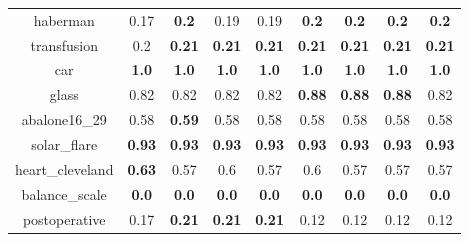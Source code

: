 \documentclass{article}%
\begin{document}
\begin{tabular}{c|cccccccc}
haberman&0.17&\textbf{0.2}&0.19&0.19&\textbf{0.2}&\textbf{0.2}&\textbf{0.2}&\textbf{0.2}\\%

transfusion&0.2&\textbf{0.21}&\textbf{0.21}&\textbf{0.21}&\textbf{0.21}&\textbf{0.21}&\textbf{0.21}&\textbf{0.21}\\%

car&\textbf{1.0}&\textbf{1.0}&\textbf{1.0}&\textbf{1.0}&\textbf{1.0}&\textbf{1.0}&\textbf{1.0}&\textbf{1.0}\\%

glass&0.82&0.82&0.82&0.82&\textbf{0.88}&\textbf{0.88}&\textbf{0.88}&0.82\\%

abalone16\_29&0.58&\textbf{0.59}&0.58&0.58&0.58&0.58&0.58&0.58\\%

solar\_flare&\textbf{0.93}&\textbf{0.93}&\textbf{0.93}&\textbf{0.93}&\textbf{0.93}&\textbf{0.93}&\textbf{0.93}&\textbf{0.93}\\%

heart\_cleveland&\textbf{0.63}&0.57&0.6&0.57&0.6&0.57&0.57&0.57\\%

balance\_scale&\textbf{0.0}&\textbf{0.0}&\textbf{0.0}&\textbf{0.0}&\textbf{0.0}&\textbf{0.0}&\textbf{0.0}&\textbf{0.0}\\%

postoperative&0.17&\textbf{0.21}&\textbf{0.21}&\textbf{0.21}&0.12&0.12&0.12&0.12\\%

\end{tabular}

%
\end{document}
